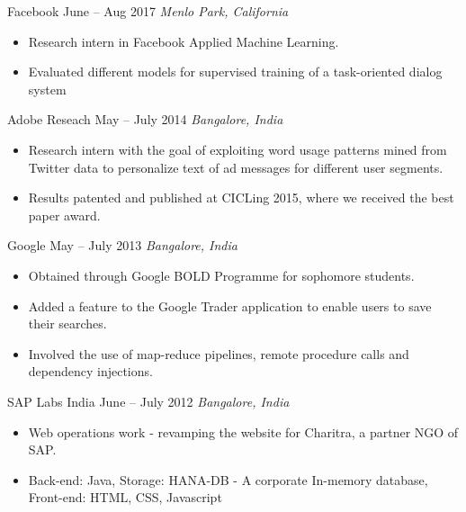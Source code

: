 \documentclass[letterpaper,10pt]{resume}
\begin{document}
{\begin{itemize}
   \credential
      {Facebook} {June -- Aug 2017}
      {\textit{Menlo Park, California}} {}
      {
		\small \begin{itemize}
			\item{Research intern in Facebook Applied Machine Learning.}
			\item{Evaluated different models for supervised training of a task-oriented dialog system}
		\end{itemize}		      
      }
  \vspace{0.2cm}


   \credential
      {Adobe Reseach} {May -- July 2014}
      {\textit{Bangalore, India}} {}
      {
		\small \begin{itemize}
			\item{Research intern with the goal of exploiting word usage patterns mined from Twitter data to personalize text of ad messages for different user segments.}
			\item{Results patented and published at CICLing 2015, where we received the best paper award.}
		\end{itemize}		      
      }
  \vspace{0.2cm}

   \credential
      {Google} {May -- July 2013}
      {\textit{Bangalore, India}} {}
      {
		\small \begin{itemize}
			\item{Obtained through Google BOLD Programme for sophomore students.}
			\item{Added a feature to the Google Trader application to enable users to save their searches.}
			\item{Involved the use of map-reduce pipelines, remote procedure calls and dependency injections.}
		\end{itemize}		      
      }
  \vspace{0.2cm}
      
  \credential
      {SAP Labs India} {June -- July 2012}
      {\textit{Bangalore, India}} {}
      {
		\small \begin{itemize}
			\item{Web operations work - revamping the website for Charitra, a partner NGO of SAP.}
			\item{Back-end: Java, Storage: HANA-DB - A corporate In-memory database, Front-end: HTML, CSS, Javascript}
		\end{itemize}		      
      }
         \vspace{0.2cm}
\end{itemize}

}
\end{document}
